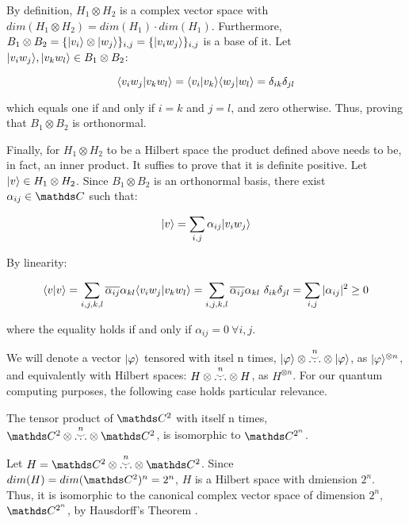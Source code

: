 \begin{proofs}
	By definition, $H_1 \otimes H_2$ is a complex vector space with $dim(H_1 \otimes H_2) = dim(H_1)\cdot dim(H_1)$. Furthermore, $B_1 \otimes B_2 = \{|v_i\rangle \otimes |w_j\rangle\}_{i,j} = \{|v_i w_j\rangle\}_{i,j}$ is a base of it. Let $|v_i w_j\rangle, |v_k w_l\rangle \in B_1 \otimes B_2$:
	
	$$ \langle v_i w_j|v_k w_l \rangle = \langle v_i|v_k \rangle \langle w_j|w_l \rangle = \delta_{ik} \delta_{jl} $$
	
	which equals one if and only if $i = k$ and $j = l$, and zero otherwise. Thus, proving that $B_1 \otimes B_2$ is orthonormal.
	
	Finally, for $H_1 \otimes H_2$ to be a Hilbert space the product defined above needs to be, in fact, an inner product. It suffies to prove that it is definite positive. Let $|v\rangle \in H_1 \otimes H_2$. Since $B_1 \otimes B_2$ is an orthonormal basis, there exist $\alpha_{ij} \in \C$ such that:
	
	$$ |v\rangle = \sum_{i,j} \alpha_{ij} |v_i w_j\rangle $$
	
	By linearity:
	
	$$ \langle v|v \rangle = \sum_{i,j,k,l} \overline{\alpha_{ij}} \alpha_{kl} \langle v_i w_j|v_k w_l \rangle = \sum_{i,j,k,l} \overline{\alpha_{ij}} \alpha_{kl} \  \delta_{ik} \delta_{jl} = \sum_{i,j} |\alpha_{ij}|^2  \geq 0 $$
	
	where the equality holds if and only if $\alpha_{ij} = 0 \ \forall i,j$.
	
\end{proofs}

We will denote a vector $|\varphi\rangle$ tensored with itsel n times, $|\varphi\rangle \otimes \overset{\substack{n\\\smile}}{\dotsc} \otimes |\varphi\rangle$, as $|\varphi\rangle^{\otimes n}$, and equivalently with Hilbert spaces: $H \otimes \overset{\substack{n\\\smile}}{\dotsc} \otimes H$, as $H^{\otimes n}$. For our quantum computing purposes, the following case holds particular relevance.

\begin{corollary}
	The tensor product of $\C^2$ with itself n times, $\C^2 \otimes \overplace{n}{\dotsc} \otimes \C^2$, is isomorphic to $\C^{2^n}$.
\end{corollary}

\begin{proofs}
	Let $H = \C^2 \otimes \overplace{n}{\dotsc} \otimes \C^2$. Since $dim(H) = dim(\C^2)^n = 2^n$, $H$ is a Hilbert space with dmiension $2^n$. Thus, it is isomorphic to the canonical complex vector space of dimension $2^n$, $\C^{2^n}$, by Hausdorff's Theorem \cite{Paya2020}.
\end{proofs}


